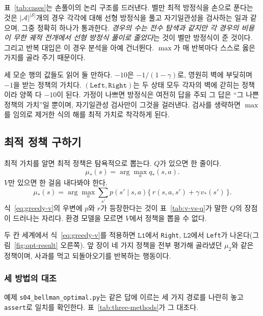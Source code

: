 \documentclass[11pt,a4paper]{article}
\newcommand{\Sset}{\mathcal{S}}
\newcommand{\Aset}{\mathcal{A}}
\newcommand{\Lone}{\texttt{L1}}
\newcommand{\Ltwo}{\texttt{L2}}
\begin{document}
표~\ref{tab:cases}는 손풀이의 논리 구조를 드러낸다. 벨만 최적 방정식을 손으로 푼다는 것은
$|\Aset|^{|\Sset|}$개의 경우 각각에 대해 선형 방정식을 풀고 자기일관성을 검사하는 일과 같으며, 그중
정확히 하나가 통과한다.
\emph{경우의 수는 전수 탐색과 같지만 각 경우의 비용이 무한 궤적 전개에서 선형 방정식 풀이로 줄었다}는
것이 벨만 방정식이 준 것이다. 그리고 반복 대입은 이 경우 분석을 아예 건너뛴다. $\max$가 매 반복마다
스스로 옳은 가지를 골라 주기 때문이다.

세 모순 행의 값들도 읽어 둘 만하다. $-10$은 $-1/(1-\gamma)$로, 영원히 벽에 부딪히며 $-1$을 받는 정책의
가치다. $(\texttt{Left},\texttt{Right})$는 두 상태 모두 각자의 벽에 갇히는 정책이라 양쪽 다 $-10$이 된다.
가정이 나쁘면 방정식은 여전히 답을 주되 그 답은 ``그 나쁜 정책의 가치''일 뿐이며, 자기일관성 검사만이
그것을 걸러낸다. 검사를 생략하면 $\max$를 임의로 제거한 식의 해를 최적 가치로 착각하게 된다.

\subsection{최적 정책 구하기}
\label{sec:opt-policy}

최적 가치를 알면 최적 정책은 탐욕적으로 뽑는다. $Q$가 있으면 한 줄이다.
\begin{equation}
  \mu_*(s) = \arg\max_{a} q_*(s,a).
  \label{eq:greedy-q}
\end{equation}
$V$만 있으면 한 걸음 내다봐야 한다.
\begin{equation}
  \mu_*(s) = \arg\max_{a} \sum_{s'} p(s'\mid s,a)\bigl\{\, r(s,a,s') + \gamma\, v_*(s') \,\bigr\}.
  \label{eq:greedy-v}
\end{equation}
식~\eqref{eq:greedy-v}의 우변에 $p$와 $r$가 등장한다는 것이 표~\ref{tab:v-vs-q}가 말한 $Q$의 장점이
드러나는 자리다. 환경 모델을 모르면 $V$에서 정책을 뽑을 수 없다.

두 칸 세계에서 식~\eqref{eq:greedy-v}를 적용하면 $\Lone$에서 \texttt{Right}, $\Ltwo$에서 \texttt{Left}가
나온다(그림~\ref{fig:opt-result} 오른쪽). 앞 장이 네 가지 정책을 전부 평가해 골라냈던 $\mu_2$와 같은
정책이며, 사과를 먹고 되돌아오기를 반복하는 행동이다.

\subsubsection{세 방법의 대조}

예제 \texttt{s04\_bellman\_optimal.py}는 같은 답에 이르는 세 가지 경로를 나란히 놓고
\lstinline|assert|로 일치를 확인한다. 표~\ref{tab:three-methods}가 그 대조다.
\end{document}
